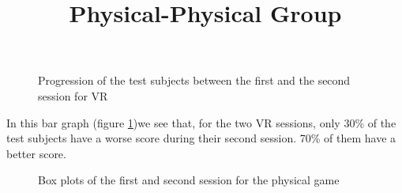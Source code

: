 \documentclass[12pt, openany, twocolumn]{article}
\begin{document}
                \begin{figure}[H]
                    \centering
                    \setlength{\fboxsep}{0pt}
                    \caption{Progression of the test subjects between the first and the second session for VR}
                    \label{figure10}
                \end{figure}

            In this bar graph (figure \ref{figure10})we see that, for the two VR sessions, only 30\% of the test subjects have a worse score during their second session. 
            70\% of them have a better score.
            \\

            \noindent \title{\textbf{Physical-Physical Group}}           
                \begin{figure}[H]
                    \centering
                    \setlength{\fboxsep}{0pt}
                    \caption{Box plots of the first and second session for the physical game}
                    \label{figure11}
                \end{figure}
\end{document}
